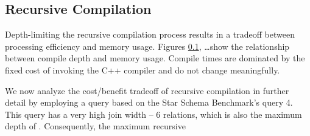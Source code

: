 
\subsection{Recursive Compilation}
Depth-limiting the recursive compilation process results in a tradeoff between processing efficiency and memory usage.  Figures \ref{}, \ldots show the relationship between compile depth and memory usage.  Compile times are dominated by the fixed cost of invoking the C++ compiler  and do not change meaningfully.


We now analyze the cost/benefit tradeoff of recursive compilation in further detail by employing a query based on the Star Schema Benchmark's\cite{} query 4.  This query has a very high join width -- 6 relations, which is also the maximum depth of .  Consequently, the maximum recursive 


